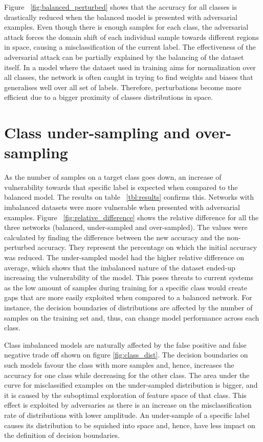 Figure ~\ref{fig:balanced_perturbed} shows that the accuracy for all classes is drastically reduced when the balanced model is presented with adversarial examples. Even though there is enough samples for each class, the adversarial attack forces the domain shift of each individual sample towards different regions in space, causing a misclassification of the current label. The effectiveness of the adversarial attack can be partially explained by the balancing of the dataset itself. In a model where the dataset used in training aims for normalization over all classes, the network is often caught in trying to find weights and biases that generalises well over all set of labels. Therefore, perturbations become more efficient due to a bigger proximity of classes distributions in space.


\section{Class under-sampling and over-sampling}


As the number of samples on a target class goes down, an increase of vulnerability towards that specific label is expected when compared to the balanced model. The results on table  ~\ref{tbl:results} confirms this. Networks with imbalanced datasets were more vulnerable when presented with adversarial examples. Figure ~\ref{fig:relative_difference} shows the relative difference for all the three networks (balanced, under-sampled and over-sampled).  The values were calculated by finding the difference between the new accuracy and the non-perturbed accuracy. They represent the percentage on which the initial accuracy was reduced. The under-sampled model had the higher relative difference on average, which shows that the imbalanced nature of the dataset ended-up increasing the vulnerability of the model. This poses threats to current systems as the low amount of samples during training for a specific class would  create gaps that are more easily exploited when compared to a balanced network. For instance, the decision boundaries of distributions are affected by the number of samples on the training set and, thus, can change model performance across each class.

Class imbalanced models are naturally affected by the false positive and false negative trade off shown on figure \ref{fig:class_dist}. The decision boundaries on such models favour the class with more samples and, hence, increases the accuracy for one class while decreasing for the other class. The area under the curve for misclassified examples on the under-sampled distribution is bigger, and it is caused by the suboptimal exploration of feature space of that class. This effect is exploited by adversaries as there is an increase on the misclassification rate of distributions with lower amplitude. An under-sample of a specific label causes its distribution to be squished into space and, hence, have less impact on the definition of decision boundaries.

